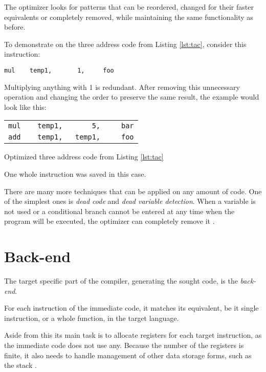             The optimizer looks for patterns that can be reordered, changed for their faster equivalents or completely removed, while maintaining the same functionality as before.

            To demonstrate on the three address code from Listing \ref{lst:tac}, consider this instruction:

            \begin{center}\verb|mul    temp1,       1,     foo|\end{center}

            Multiplying anything with 1 is redundant. After removing this unnecessary operation and changing the order to preserve the same result, the example would look like this:

            \begin{listing}\centering\begin{tabular}{l}
            \verb|mul    temp1,       5,     bar|\\
            \verb|add    temp1,   temp1,     foo|\\
            \end{tabular}
            \caption{Optimized three address code from Listing \ref{lst:tac}}\label{lst:opttac}
            \end{listing}

            One whole instruction was saved in this case.

            There are many more techniques that can be applied on any amount of code. One of the simplest ones is \emph{dead code} and \emph{dead variable detection}. When a variable is not used or a conditional branch cannot be entered at any time when the program will be executed, the optimizer can completely remove it \cite{OptimizingCompiler}.

    \section{Back-end}\label{desc_backend}

        The target specific part of the compiler, generating the sought code, is the \emph{back-end}.

        For each instruction of the immediate code, it matches its equivalent, be it single instruction, or a whole function, in the target language.

        Aside from this its main task is to allocate registers for each target instruction, as the immediate code does not use any. Because the number of the registers is finite, it also needs to handle management of other data storage forms, such as the stack \cite{DragonBook}.


